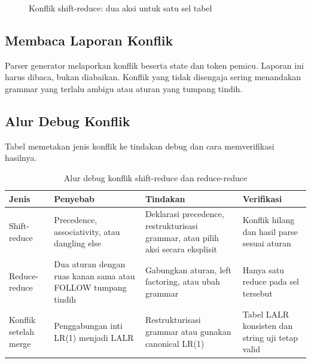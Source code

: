 \begin{figure}[H]
\centering
{}
\caption{Konflik shift-reduce: dua aksi untuk satu sel tabel}
\label{fig:ch12-konflik}
\end{figure}

\subsection{Membaca Laporan Konflik}

Parser generator melaporkan konflik beserta state dan token pemicu.
Laporan ini harus dibaca, bukan diabaikan. Konflik yang tidak
disengaja sering menandakan grammar yang terlalu ambigu atau aturan
yang tumpang tindih.

\subsection{Alur Debug Konflik}

Tabel  memetakan jenis konflik ke tindakan
debug dan cara memverifikasi hasilnya.

\begin{table}[H]
\centering
\caption{Alur debug konflik shift-reduce dan reduce-reduce}
\label{tab:ch12-debug}
\begin{tabularx}{\textwidth}{@{}l X X X@{}}
\toprule
\textbf{Jenis} & \textbf{Penyebab} & \textbf{Tindakan} &
\textbf{Verifikasi} \\
\midrule
Shift-reduce & Precedence, associativity, atau dangling else &
Deklarasi precedence, restrukturisasi grammar, atau pilih aksi
secara eksplisit & Konflik hilang dan hasil parse sesuai aturan \\
Reduce-reduce & Dua aturan dengan ruas kanan sama atau FOLLOW
tumpang tindih & Gabungkan aturan, left factoring, atau ubah grammar &
Hanya satu reduce pada sel tersebut \\
Konflik setelah merge & Penggabungan inti LR(1) menjadi LALR &
Restrukturisasi grammar atau gunakan canonical LR(1) &
Tabel LALR konsisten dan string uji tetap valid \\
\bottomrule
\end{tabularx}
\end{table}

